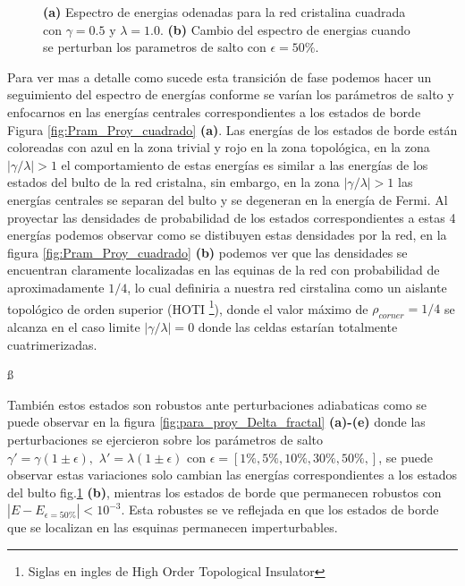 \begin{figure}[h!]
\begin{subfigure}[b!]{0.5 \textwidth}
    \end{subfigure}\hspace*{-0.9em}
       \caption{\textbf{(a)} Espectro de energias odenadas para la red cristalina cuadrada con $\gamma = 0.5$ y $\lambda = 1.0$. \textbf{(b)} Cambio del espectro de energias cuando se perturban los parametros de salto con $\epsilon = 50\%$.}
       \label{fig:spectre_square_epsi}
\end{figure}


Para ver mas a detalle como sucede esta transición de fase podemos hacer un seguimiento del espectro de energías conforme se varían los parámetros de salto y enfocarnos en las energías centrales correspondientes a los estados de borde Figura \ref{fig:Pram_Proy_cuadrado} \textbf{(a)}. Las energías de los estados de borde están coloreadas con azul en la zona trivial y rojo en la zona topológica, en la zona $|\gamma/\lambda|>1$ el comportamiento de estas energías es similar a las energías de los estados del bulto de la red cristalna, sin embargo, en la zona $|\gamma/\lambda|>1$ las energías centrales se separan del bulto y se degeneran en la energía de Fermi. Al proyectar las densidades de probabilidad de los estados correspondientes a estas 4 energías podemos observar como se distibuyen estas densidades por la red, en la figura \ref{fig:Pram_Proy_cuadrado} \textbf{(b)} podemos ver que las densidades se encuentran claramente localizadas en las equinas de la red con probabilidad de aproximadamente $1/4$, lo cual definiria a nuestra red cirstalina como un aislante topológico de orden superior (HOTI \footnote{Siglas en ingles de High Order Topological Insulator}), donde el valor máximo de $\rho_{corner} = 1/4$ se alcanza en el caso limite $|\gamma/\lambda| = 0$ donde las celdas estarían totalmente cuatrimerizadas.


ß

También estos estados son robustos ante perturbaciones adiabaticas como se puede observar en la figura \ref{fig:para_proy_Delta_fractal} \textbf{(a)-(e)} donde las perturbaciones se ejercieron sobre los parámetros de salto $\gamma' = \gamma( 1 \pm \epsilon) ,\, \, \lambda' = \lambda( 1 \pm \epsilon)$ con $\epsilon = [1\%, 5\%, 10\%,30\%,50\%,]$, se puede observar estas variaciones solo cambian las energías correspondientes a los estados del bulto fig.\ref{fig:spectre_square_epsi} \textbf{(b)}, mientras los estados de borde que permanecen robustos con $|E - E_{\epsilon = 50\%}| < 10^{-3}$. Esta robustes se ve reflejada en que los estados de borde que se localizan en las esquinas permanecen imperturbables.


